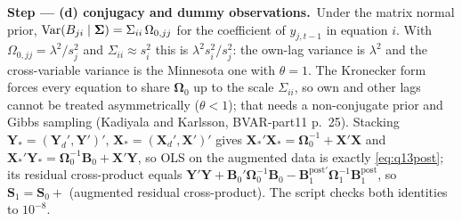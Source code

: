 \documentclass[11pt,a4paper]{article}
\newcommand{\passo}[2]{\par\smallskip\noindent\textbf{Step --- #1.}~#2}
\begin{document}
\begin{sol}
\passo{(d) conjugacy and dummy observations}{Under the matrix normal prior,
$\mathrm{Var}(B_{ji}\mid\bm{\Sigma})=\Sigma_{ii}\,\Omega_{0,jj}$ for the coefficient of $y_{j,t-1}$ in equation $i$. With
$\Omega_{0,jj}=\lambda^2/s_j^2$ and $\Sigma_{ii}\approx s_i^2$ this is $\lambda^2 s_i^2/s_j^2$: the own-lag variance is
$\lambda^2$ and the cross-variable variance is the Minnesota one with $\theta=1$. The Kronecker form forces every
equation to share $\bm\Omega_0$ up to the scale $\Sigma_{ii}$, so own and other lags cannot be treated asymmetrically
($\theta<1$); that needs a non-conjugate prior and Gibbs sampling (Kadiyala and Karlsson, BVAR-part11 p.~25).
Stacking $\bm Y_*=(\bm Y_d',\bm Y')'$, $\bm X_*=(\bm X_d',\bm X')'$ gives
$\bm X_*'\bm X_*=\bm\Omega_0^{-1}+\bm X'\bm X$ and $\bm X_*'\bm Y_*=\bm\Omega_0^{-1}\bm B_0+\bm X'\bm Y$, so OLS on the
augmented data is exactly \eqref{eq:q13post}; its residual cross-product equals
$\bm Y'\bm Y+\bm B_0'\bm\Omega_0^{-1}\bm B_0-\bm B_1^{\mathrm{post}\prime}\bm\Omega_1^{-1}\bm B_1^{\mathrm{post}}$, so
$\bm S_1=\bm S_0+$ (augmented residual cross-product). The script checks both identities to $10^{-8}$.}


\end{sol}
\end{document}
